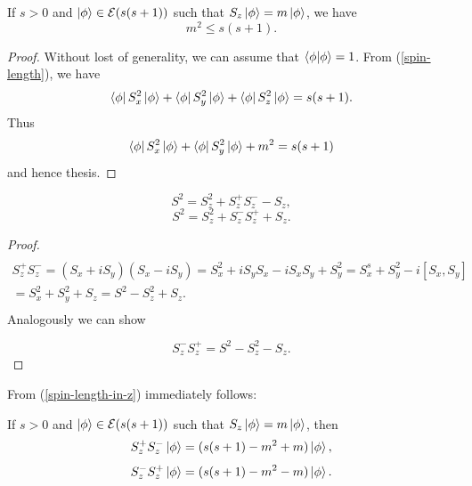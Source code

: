 \documentclass[main.tex]{subfiles}
\begin{document}
\begin{fact}
If $s > 0$ and $\ket{\phi} \in \mathcal{E}(s(s + 1))$ such that $S_z\ket{\phi} = m\ket{\phi}$, we have
\begin{equation}
m^2 \leq s(s + 1).
\end{equation}
\end{fact}
\begin{proof}
Without lost of generality, we can assume that $\bra{\phi}\ket{\phi} = 1$.
From (\ref{spin-length}), we have
\begin{equation}
\bra{\phi}S^2_x\ket{\phi} + \bra{\phi}S^2_y\ket{\phi} + \bra{\phi}S^2_z\ket{\phi} = s(s + 1).
\end{equation}
Thus
\begin{equation}
\bra{\phi}S^2_x\ket{\phi} + \bra{\phi}S^2_y\ket{\phi} + m^2 = s(s + 1)
\end{equation}
and hence thesis.
\end{proof}

\begin{fact}
\label{spin-length-in-z}
\begin{equation}
S^2 = S^2_z + S_z^{+}S_z^{-} - S_z,
\end{equation}
\begin{equation}
S^2 = S^2_z + S_z^{-}S_z^{+} + S_z.
\end{equation}
\end{fact}
\begin{proof}
\begin{multline*}
\\S^{+}_zS^{-}_z = (S_x + iS_y)(S_x - i S_y) = S^2_x + iS_y S_x - iS_x S_y + S^2_y = 
S^s_x + S^2_y - i[S_x, S_y]\\
=S^2_x + S^2_y + S_z = S^2 - S^2_z + S_z.\\
\end{multline*}
Analogously we can show

\begin{equation}
S^{-}_zS^{+}_z = S^2 - S^2_z - S_z.
\end{equation}
\end{proof}

From (\ref{spin-length-in-z}) immediately follows:

\begin{fact}
If $s > 0$ and $\ket{\phi} \in \mathcal{E}(s(s + 1))$ such that $S_z\ket{\phi} = m\ket{\phi}$, then
\begin{equation}
S_z^{+}S_z^{-}\ket{\phi} = (s(s+1) - m^2 + m)\ket{\phi},
\end{equation}
\begin{equation}
S_z^{-}S_z^{+}\ket{\phi} = (s(s+1) - m^2 - m)\ket{\phi}.
\end{equation}
\end{fact}
\end{document}
